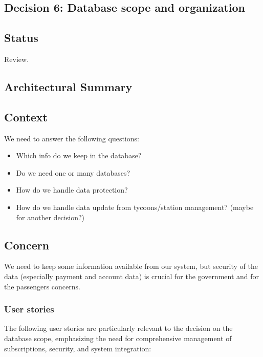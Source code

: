\subsection{Decision 6: Database scope and organization}

\subsection*{Status}
Review.

\subsection*{Architectural Summary}


\subsection*{Context}
We need to answer the following questions:
\begin{itemize}
\item Which info do we keep in the database? 
\item Do we need one or many databases?
\item How do we handle data protection?
\item How do we handle data update from tycoons/station management? (maybe for another decision?)
\end{itemize}

\subsection*{Concern}
We need to keep some information available from our system, but security of the data (especially payment and account data) is crucial for the government and for the passengers concerns.

\subsubsection*{User stories}
The following user stories are particularly relevant to the decision on the database scope, emphasizing the need for comprehensive management of subscriptions, security, and system integration:

